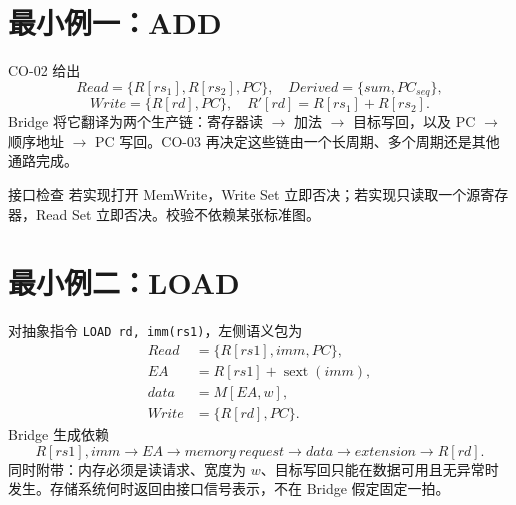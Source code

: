 \documentclass[UTF8,fontset=fandol,11pt,a4paper]{ctexart}
\newcommand{\code}[1]{\texttt{#1}}
\begin{document}
\begin{center}
\end{center}

\section{最小例一：ADD}

CO-02 给出
\[
Read=\{R[rs_1],R[rs_2],PC\},\quad
Derived=\{sum,PC_{seq}\},
\]
\[
Write=\{R[rd],PC\},\quad
R'[rd]=R[rs_1]+R[rs_2].
\]
Bridge 将它翻译为两个生产链：寄存器读 $\to$ 加法 $\to$ 目标写回，以及 PC $\to$ 顺序地址 $\to$ PC 写回。CO-03 再决定这些链由一个长周期、多个周期还是其他通路完成。

\begin{warnbox}{接口检查}
若实现打开 MemWrite，Write Set 立即否决；若实现只读取一个源寄存器，Read Set 立即否决。校验不依赖某张标准图。
\end{warnbox}

\section{最小例二：LOAD}

对抽象指令 \code{LOAD rd, imm(rs1)}，左侧语义包为
\[
\begin{aligned}
Read&=\{R[rs1],imm,PC\},\\
EA&=R[rs1]+\operatorname{sext}(imm),\\
data&=M[EA,w],\\
Write&=\{R[rd],PC\}.
\end{aligned}
\]
Bridge 生成依赖
\[
R[rs1],imm\to EA\to memory\ request\to data\to extension\to R[rd].
\]
同时附带：内存必须是读请求、宽度为 $w$、目标写回只能在数据可用且无异常时发生。存储系统何时返回由接口信号表示，不在 Bridge 假定固定一拍。
\end{document}
